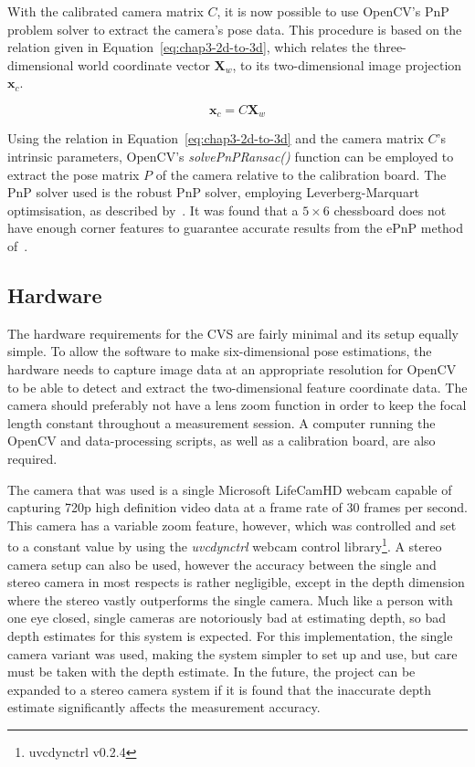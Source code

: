 With the calibrated camera matrix $C$, it is now possible to use OpenCV's PnP problem solver to extract the camera's pose data. This procedure is based on the relation given in Equation~\ref{eq:chap3-2d-to-3d}, which relates the three-dimensional world coordinate vector $\bm{X}_w$, to its two-dimensional image projection $\bm{x}_c$.  

\begin{equation}
   \label{eq:chap3-2d-to-3d}
   \bm{x}_c
   = C
   \bm{X}_w
\end{equation}

Using the relation in Equation~\ref{eq:chap3-2d-to-3d} and the camera matrix $C$'s intrinsic parameters, OpenCV's \emph{solvePnPRansac()} function can be employed to extract the pose matrix $P$ of the camera relative to the calibration board. The PnP solver used is the robust PnP solver, employing Leverberg-Marquart optimsisation, as described by~\cite{schweighofer2006robust}. It was found that a $5\times6$ chessboard does not have enough corner features to guarantee accurate results from the ePnP method of~\cite{lepetit2009epnp}.

\subsection{Hardware}

The hardware requirements for the CVS are fairly minimal and its setup equally simple. To allow the software to make six-dimensional pose estimations, the hardware needs to capture image data at an appropriate resolution for OpenCV to be able to detect and extract the two-dimensional feature coordinate data. The camera should preferably not have a lens zoom function in order to keep the focal length constant throughout a measurement session. A computer running the OpenCV and data-processing scripts, as well as a calibration board, are also required. 

The camera that was used is a single Microsoft LifeCamHD webcam capable of capturing 720p high definition video data at a frame rate of 30 frames per second. This camera has a variable zoom feature, however, which was controlled and set to a constant value by using the \emph{uvcdynctrl} webcam control library\footnote{uvcdynctrl v0.2.4}. A stereo camera setup can also be used, however the accuracy between the single and stereo camera in most respects is rather negligible, except in the depth dimension where the stereo vastly outperforms the single camera. Much like a person with one eye closed, single cameras are notoriously bad at estimating depth, so bad depth estimates for this system is expected. For this implementation, the single camera variant was used, making the system simpler to set up and use, but care must be taken with the depth estimate. In the future, the project can be expanded to a stereo camera system if it is found that the inaccurate depth estimate significantly affects the measurement accuracy.

